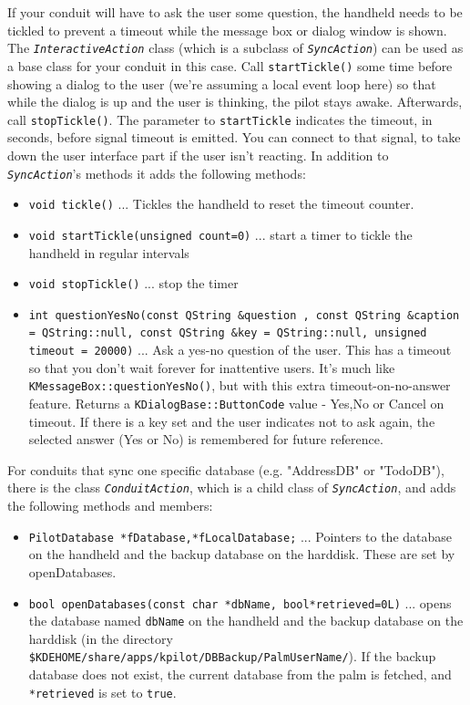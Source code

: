 \documentclass[10pt,a4paper]{article}
\newcommand{\code}[1]{{\small\texttt{#1}}}
\newcommand{\file}[1]{{\small\texttt{#1}}}
\newcommand{\class}[1]{{\small\em\texttt{#1}}}
\begin{document}
If your conduit will have to ask the user some question, the handheld needs to be tickled to prevent a timeout while the message box or dialog window is shown. The \class{InteractiveAction} class (which is a subclass of \class{SyncAction}) can be used as a base class for your conduit in this case. Call \code{startTickle()} some time before showing a dialog to the user (we're assuming a local event loop here) so that while the dialog is up and the user is thinking, the pilot stays awake. Afterwards, call \code{stopTickle()}. The parameter to \code{startTickle} indicates the timeout, in seconds, before signal timeout is emitted. You can connect to that signal, to take down the user interface part if the user isn't reacting.
In addition to \class{SyncAction}'s methods it adds the following methods:

\begin{itemize}
\item\code{void tickle()} ... Tickles the handheld to reset the timeout counter.
\item \code{void startTickle(unsigned count=0)} ... start a timer to tickle 
the handheld in regular intervals
\item \code{void stopTickle()} ... stop the timer

\item\code{int questionYesNo(const QString \&question ,
        const QString \&caption = QString::null,
        const QString \&key = QString::null,
        unsigned timeout = 20000)} ... Ask a yes-no question of the user. 
        This has a timeout so that you don't wait forever for inattentive users. 
        It's much like \code{KMessageBox::questionYesNo()}, but with this extra 
        timeout-on-no-answer feature. Returns a \code{KDialogBase::ButtonCode} 
        value - Yes,No or Cancel on timeout. If there is a key set and the user 
        indicates not to ask again, the selected answer (Yes or No) is 
        remembered for future reference.
\end{itemize}


For conduits that sync one specific database (e.g. "AddressDB" or "TodoDB"), 
there is the class \class{ConduitAction}, which is a child class of 
\class{SyncAction}, and adds the following methods and members:

\begin{itemize}
\item\code{PilotDatabase *fDatabase,*fLocalDatabase;} ... Pointers to the 
database on the handheld and the backup database on the harddisk. These are 
set by openDatabases.
\item\code{bool openDatabases(const char *dbName, bool*retrieved=0L)} ... 
opens the database named \code{dbName} on the handheld and the backup database 
on the harddisk (in the directory \file{\$KDEHOME/share/apps/kpilot/DBBackup/PalmUserName/}). 
If the backup database does not exist, the current database from the palm is 
fetched, and \code{*retrieved} is set to \code{true}.
\end{itemize} 
\end{document}
